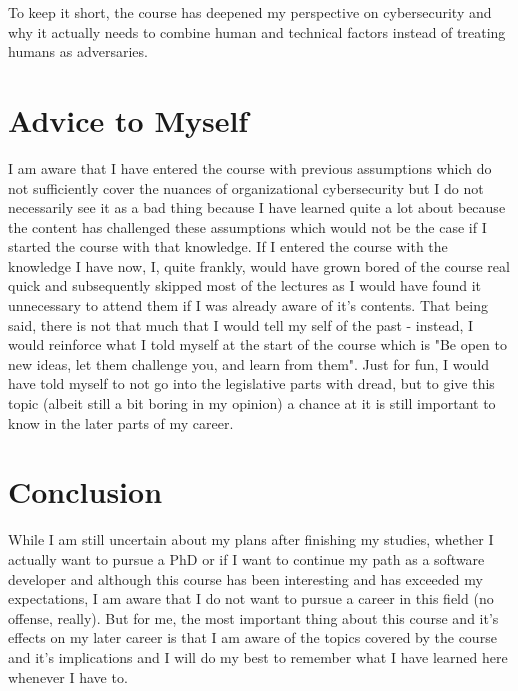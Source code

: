 \documentclass[12pt]{article}
\begin{document}
\newline 
To keep it short, the course has deepened my perspective on cybersecurity and why it actually needs to combine human and technical factors instead of treating humans as adversaries.

\section{Advice to Myself}
I am aware that I have entered the course with previous assumptions which do not sufficiently cover the nuances of organizational cybersecurity but I do not necessarily see it as a bad thing because I have learned quite a lot about because the content has challenged these assumptions which would not be the case if I started the course with that knowledge. If I entered the course with the knowledge I have now, I, quite frankly, would have grown bored of the course real quick and subsequently skipped most of the lectures as I would have found it unnecessary to attend them if I was already aware of it's contents.
\newline
That being said, there is not that much that I would tell my self of the past - instead, I would reinforce what I told myself at the start of the course which is "Be open to new ideas, let them challenge you, and learn from them". Just for fun, I would have told myself to not go into the legislative parts with dread, but to give this topic (albeit still a bit boring in my opinion) a chance at it is still important to know in the later parts of my career.

\section{Conclusion}
While I am still uncertain about my plans after finishing my studies, whether I actually want to pursue a PhD or if I want to continue my path as a software developer and although this course has been interesting and has exceeded my expectations, I am aware that I do not want to pursue a career in this field (no offense, really).
\newline
But for me, the most important thing about this course and it's effects on my later career is that I am aware of the topics covered by the course and it's implications and I will do my best to remember what I have learned here whenever I have to.
\end{document}
